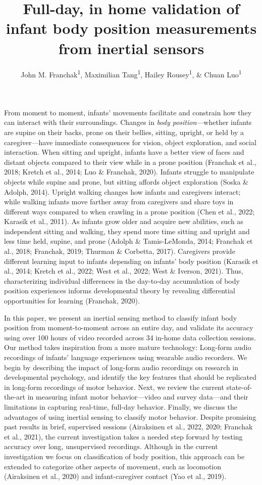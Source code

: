 \documentclass[
  man]{apa6}
\title{Full-day, in home validation of infant body position measurements from inertial sensors}
\author{John M. Franchak\textsuperscript{1}, Maximilian Tang\textsuperscript{1}, Hailey Rousey\textsuperscript{1}, \& Chuan Luo\textsuperscript{1}}
\date{}
\affiliation{\phantom{0}}
\begin{document}
\maketitle

From moment to moment, infants' movements facilitate and constrain how they can interact with their surroundings. Changes in \emph{body position}---whether infants are supine on their backs, prone on their bellies, sitting, upright, or held by a caregiver---have immediate consequences for vision, object exploration, and social interaction. When sitting and upright, infants have a better view of faces and distant objects compared to their view while in a prone position (Franchak et al., 2018; Kretch et al., 2014; Luo \& Franchak, 2020). Infants struggle to manipulate objects while supine and prone, but sitting affords object exploration (Soska \& Adolph, 2014). Upright walking changes how infants and caregivers interact; while walking infants move farther away from caregivers and share toys in different ways compared to when crawling in a prone position (Chen et al., 2022; Karasik et al., 2011). As infants grow older and acquire new abilities, such as independent sitting and walking, they spend more time sitting and upright and less time held, supine, and prone (Adolph \& Tamis-LeMonda, 2014; Franchak et al., 2018; Franchak, 2019; Thurman \& Corbetta, 2017). Caregivers provide different learning input to infants depending on infants' body position (Karasik et al., 2014; Kretch et al., 2022; West et al., 2022; West \& Iverson, 2021). Thus, characterizing individual differences in the day-to-day accumulation of body position experiences informs developmental theory by revealing differential opportunities for learning (Franchak, 2020).

In this paper, we present an inertial sensing method to classify infant body position from moment-to-moment across an entire day, and validate its accuracy using over 100 hours of video recorded across 34 in-home data collection sessions. Our method takes inspiration from a more mature technology: Long-form audio recordings of infants' language experiences using wearable audio recorders. We begin by describing the impact of long-form audio recordings on research in developmental psychology, and identify the key features that should be replicated in long-form recordings of motor behavior. Next, we review the current state-of-the-art in measuring infant motor behavior---video and survey data---and their limitations in capturing real-time, full-day behavior. Finally, we discuss the advantages of using inertial sensing to classify motor behavior. Despite promising past results in brief, supervised sessions (Airaksinen et al., 2022, 2020; Franchak et al., 2021), the current investigation takes a needed step forward by testing accuracy over long, unsupervised recordings. Although in the current investigation we focus on classification of body position, this approach can be extended to categorize other aspects of movement, such as locomotion (Airaksinen et al., 2020) and infant-caregiver contact (Yao et al., 2019).
\end{document}
